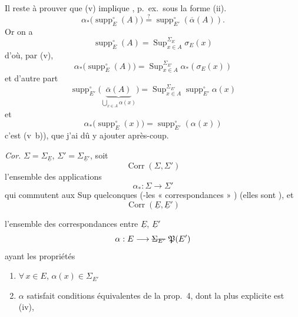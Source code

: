 \documentclass[11pt,a4paper]{article}
\begin{document}
Il reste à prouver que (v) implique , p.~ex.\ sous la forme (ii).
\[
  \alpha_{*}\bigl(\operatorname{supp}^{\circ}_E(A)\bigr) \overset{?}{=} \operatorname{supp}^{\circ}_{E'}(\overline{\alpha}(A)) .
\]
Or on a
\[
  \operatorname{supp}^{\circ}_E(A) = \operatorname{Sup}^{\Sigma_E}_{x \in A} \sigma_E(x)
\]
d'où, par (v),
\[
  \alpha_{*}\bigl(\operatorname{supp}^{\circ}_E(A)\bigr) = \operatorname{Sup}^{\Sigma_{E'}}_{x \in A} \alpha_{*}(\sigma_E(x))
\]
et d'autre part
\[
  \operatorname{supp}^{\circ}_{E'}\bigl(\underbrace{\overline{\alpha}(A)}_{\bigcup_{x \in A} \alpha(x)}\bigr) = \operatorname{Sup}^{\Sigma_{E'}}_{x \in A} \operatorname{supp}^{\circ}_{E'} \alpha(x)
\]
et 
\[
  \alpha_{*}\bigl(\operatorname{supp}^{\circ}_E(x)\bigr) = \operatorname{supp}^{\circ}_{E'}(\alpha(x))
\]
c'est (v~b)), que j'ai dû y ajouter après-coup.


\emph{Cor.}   $\Sigma = \Sigma_{\underline{E}}$, $\Sigma' = \Sigma_{\underline{E}'}$, soit
\[
  \operatorname{Corr}(\Sigma, \Sigma')
\]
l'ensemble des applications
\[
  \alpha_{*} : \Sigma \longrightarrow \Sigma'
\]
qui commutent aux Sup quelconques (-les « correspondances »  ) (elles sont ), et
\[
  \operatorname{Corr}(\underline{E}, \underline{E}')
\]


l'ensemble des  correspondances entre $\underline{E}$, $\underline{E}'$
\[
  \alpha : E \longrightarrow \text{\struck{$\Sigma_{E'}$}}\ \mathfrak{P}(E')
\]
ayant les propriétés
\begin{enumerate}
  \item[a)] $\forall\, x \in E$, $\alpha(x) \in \Sigma_{E'}$
  \item[b)] $\alpha$ satisfait   conditions équivalentes de la prop.~4, dont la plus explicite est \struck{\uncertain{\ill{}}} (iv), \struck{\ill{}}
\end{enumerate}
\end{document}
